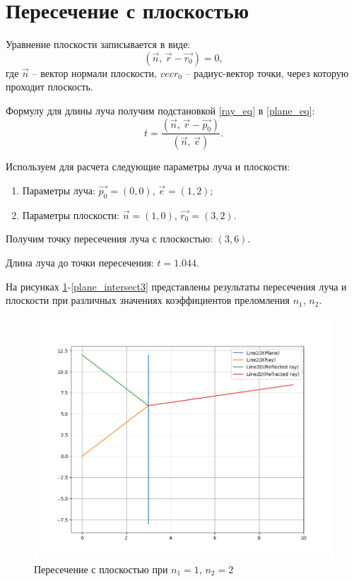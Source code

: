 \section{Пересечение с плоскостью}
{
	Уравнение плоскости записывается в виде:
	\begin{equation}\label{plane_eq}
	(\vec{n},\, \vec{r} - \vec{r_0}) = 0,
	\end{equation}
	где $\vec{n}$ -- вектор нормали плоскости, $vec{r_0}$ -- радиус-вектор точки, через которую проходит плоскость.
	
	Формулу для длины луча получим подстановкой \eqref{ray_eq} в \eqref{plane_eq}:
	\begin{equation}\label{ray_plane_distance}
	t = \frac{(\vec{n},\, \vec{r} - \vec{p_0})}{(\vec{n},\, \vec{e})}.
	\end{equation}
	
	Используем для расчета следующие параметры луча и плоскости:
	\begin{enumerate}
	\item Параметры луча: $\vec{p_0} = (0, 0)$, $\vec{e} = (1, 2)$;
	\item Параметры плоскости: $\vec{n} = (1, 0)$, $\vec{r_0} = (3, 2)$.
	\end{enumerate}
	
	Получим точку пересечения луча с плоскостью: $(3, 6)$.
	
	Длина луча до точки пересечения: $t = 1.044$.
	
	На рисунках \ref{plane_intersect1}-\ref{plane_intersect3} представлены результаты пересечения луча и плоскости при различных значениях коэффициентов преломления $n_1$, $n_2$.

	\begin{figure}[H]
		\centering
		\includegraphics[width=0.65\pagewidth]{plane_intersect1}
		\caption{Пересечение с плоскостью при $n_1 = 1$, $n_2 = 2$}
		\label{plane_intersect1}
	\end{figure}
	
}

